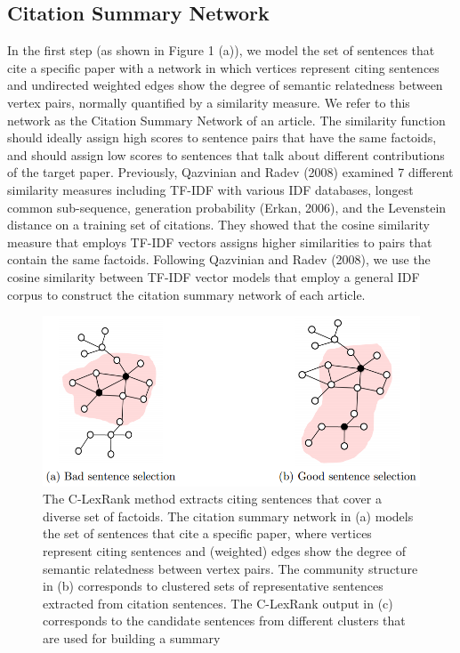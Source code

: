 \subsection{ Citation Summary Network}
In the first step (as shown in Figure 1 (a)), we model the set of sentences that cite a specific
paper with a network in which vertices represent citing sentences and undirected weighted
edges show the degree of semantic relatedness between vertex pairs, normally quantified
by a similarity measure. We refer to this network as the Citation Summary Network of
an article. The similarity function should ideally assign high scores to sentence pairs that
have the same factoids, and should assign low scores to sentences that talk about different
contributions of the target paper.
Previously, Qazvinian and Radev (2008) examined 7 different similarity measures including
TF-IDF with various IDF databases, longest common sub-sequence, generation
probability (Erkan, 2006), and the Levenstein distance on a training set of citations. They
showed that the cosine similarity measure that employs TF-IDF vectors assigns higher similarities
to pairs that contain the same factoids. Following Qazvinian and Radev (2008), we
use the cosine similarity between TF-IDF vector models that employ a general IDF corpus to construct the citation summary network of each article.

\begin{figure}[!htbp]
\centering
\includegraphics[width=15cm]{fig2lexrank.png}
\caption{ The C-LexRank method extracts citing sentences that cover a diverse set of factoids.
The citation summary network in (a) models the set of sentences that cite
a specific paper, where vertices represent citing sentences and (weighted) edges
show the degree of semantic relatedness between vertex pairs. The community
structure in (b) corresponds to clustered sets of representative sentences extracted
from citation sentences. The C-LexRank output in (c) corresponds to the candidate
sentences from different clusters that are used for building a summary}
\label{cLexRank2}
\end{figure}

